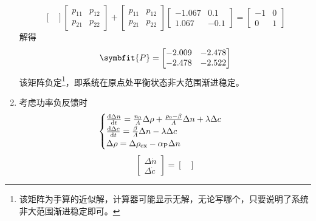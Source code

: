 \begin{exercise}
\begin{enumerate}
\begin{equation*}
\begin{bmatrix}
            \end{bmatrix} \begin{bmatrix}
                p_{11} & p_{12} \\
                p_{21} & p_{22}
            \end{bmatrix} + \begin{bmatrix}
                p_{11} & p_{12} \\
                p_{21} & p_{22}
            \end{bmatrix} \begin{bmatrix}
                -1.067 & 0.1 \\
                1.067 & -0.1
            \end{bmatrix} = \begin{bmatrix}
                -1 & 0 \\
                0 & 1
            \end{bmatrix}
        \end{equation*}
        解得
        \begin{equation*}
            \symbfit{P} = \begin{bmatrix}
                -2.009 & -2.478 \\
                -2.478 & -2.522
            \end{bmatrix}
        \end{equation*}
        该矩阵负定\footnote{该矩阵为手算的近似解，计算器可能显示无解，无论写哪个，只要说明了系统非大范围渐进稳定即可。}，即系统在原点处平衡状态非大范围渐进稳定。
        \item 考虑功率负反馈时
        \begin{equation*}
            \begin{cases}
                \frac{{\rm{d}}{\Delta n}}{{\rm{d}}{t}} = \frac{n_0}{\varLambda}\Delta \rho + \frac{\rho_0 - \beta}{\varLambda}\Delta n + \lambda \Delta c \\
                \frac{{\rm{d}}{\Delta c}}{{\rm{d}}{t}} = \frac{\beta}{\varLambda}\Delta n - \lambda \Delta c \\
                \Delta \rho = \Delta \rho_{\rm ex} - \alpha_{\rm P} \Delta n
            \end{cases}
        \end{equation*}
        \begin{equation*}
            \begin{bmatrix}
                \Delta \dot{n} \\
                \Delta \dot{c}
            \end{bmatrix} = \begin{bmatrix}

\end{bmatrix}
\end{equation*}
\end{enumerate}
\end{exercise}
